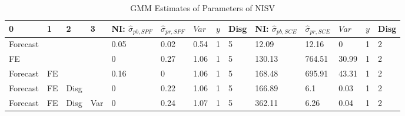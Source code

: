 \documentclass[]{article}
\begin{document}
\begin{table}
	\centering
	\caption{GMM Estimates of Parameters of NISV}
	\label{GMM_Est_NI_SV_Table}
\begin{tabular}{llllllllllllll}
		\hline 
	0        & 1  & 2    & 3   & NI: $\hat\sigma_{pb,SPF}$ & $\hat\sigma_{pr,SPF}$ & $Var$ & $y$ & Disg & NI: $\hat\sigma_{pb,SCE}$ & $\hat\sigma_{pr,SCE}$ & $Var$ & $y$ & Disg \\
	\hline 
	Forecast &    &      &     & 0.05                      & 0.02                  & 0.54  & 1   & 5    & 12.09                     & 12.16                 & 0     & 1   & 2    \\
	FE       &    &      &     & 0                         & 0.27                  & 1.06  & 1   & 5    & 130.13                    & 764.51                & 30.99 & 1   & 2    \\
	Forecast & FE &      &     & 0.16                      & 0                     & 1.06  & 1   & 5    & 168.48                    & 695.91                & 43.31 & 1   & 2    \\
	Forecast & FE & Disg &     & 0                         & 0.22                  & 1.06  & 1   & 5    & 166.89                    & 6.1                   & 0.03  & 1   & 2    \\
	Forecast & FE & Disg & Var & 0                         & 0.24                  & 1.07  & 1   & 5    & 362.11                    & 6.26                  & 0.04  & 1   & 2   \\
	\hline 
\end{tabular}
\end{table}
\end{document}
